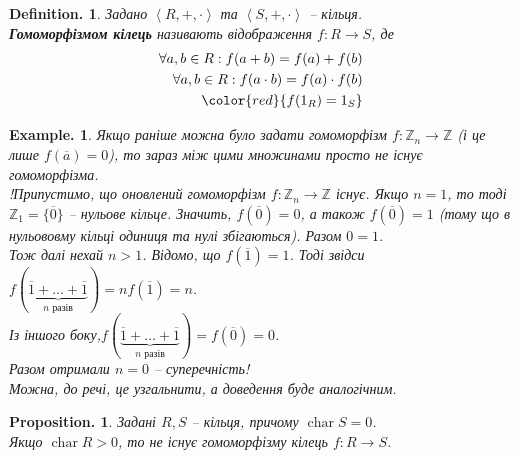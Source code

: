 \documentclass[a4paper, 10pt]{article}
\theoremstyle{theoremdd}
\theoremstyle{theoremdd}
\theoremstyle{theoremdd}
\newtheorem*{definition*}{Definition.}
\theoremstyle{theoremdd}
\theoremstyle{theoremdd}
\theoremstyle{theoremdd}
\newtheorem*{example*}{Example.}
\theoremstyle{theoremdd}
\theoremstyle{theoremdd}
\theoremstyle{theoremdd}
\theoremstyle{theoremdd}
\newtheorem*{proposition*}{Proposition.}
\theoremstyle{theoremdd}
\theoremstyle{theoremdd}
\theoremstyle{theoremdd}
\theoremstyle{theoremdd}
\theoremstyle{theoremdd}
\DeclareMathOperator{\charac}{char}
\begin{document}
\begin{definition*}
Задано $\left<R, +, \cdot \right>$ та $\left<S, +, \cdot \right>$ -- кільця.\\
\textbf{Гомоморфізмом кілець} називають відображення $f \colon R \to S$, де
\begin{align*}
\forall a,b \in R: f(a+b) = f(a) + f(b) \\
\forall a,b \in R: f(a \cdot b) = f(a) \cdot f(b) \\
\color{red}{f(1_R) = 1_S}
\end{align*}
\end{definition*}

\begin{example*}
Якщо раніше можна було задати гомоморфізм $f \colon \mathbb{Z}_n \to \mathbb{Z}$ (і це лише $f(\overline{a}) = 0$), то зараз між цими множинами просто не існує гомоморфізма.
\bigskip \\
!Припустимо, що оновлений гомоморфізм $f \colon \mathbb{Z}_n \to \mathbb{Z}$ існує. Якщо $n = 1$, то тоді $\mathbb{Z}_1 = \{ \overline{0} \}$ -- нульове кільце. Значить, $f(\overline{0}) = 0$, а також $f(\overline{0}) = 1$ (тому що в нульововму кільці одиниця та нулі збігаються). Разом $0 = 1$.\\
Тож далі нехай $n > 1$. Відомо, що $f(\overline{1}) = 1$. Тоді звідси \\
$f(\underbrace{\overline{1} + \dots + \overline{1}}_{n \text{ разів}}) = n f(\overline{1}) = n$.\\
Із іншого боку,$f(\underbrace{\overline{1} + \dots + \overline{1}}_{n \text{ разів}}) = f(\overline{0}) = 0$.\\
Разом отримали $n = 0$ -- суперечність!
\bigskip \\
Можна, до речі, це узгальнити, а доведення буде аналогічним.
\end{example*}

\begin{proposition*}
Задані $R,S$ -- кільця, причому $\charac S = 0$.\\
Якщо $\charac R > 0$, то не існує гомоморфізму кілець $f \colon R \to S$.
\end{proposition*}
\end{document}
